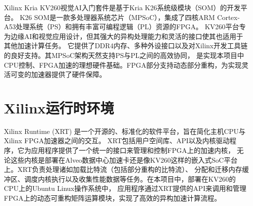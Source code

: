 Xilinx Kria KV260视觉AI入门套件是基于Kria K26系统级模块（SOM）的开发平台。
K26 SOM是一款多处理器系统芯片（MPSoC），集成了四核ARM Cortex-A53处理系统（PS）和拥有丰富可编程逻辑（PL）资源的FPGA。
KV260平台专为边缘AI和视觉应用设计，但其强大的异构处理能力和灵活的接口使其也适用于其他加速计算任务。
它提供了DDR4内存、多种外设接口以及对Xilinx开发工具链的良好支持。其MPSoC架构天然支持PS与PL之间的高效协同，
是实现本项目中CPU控制、FPGA加速的理想硬件基础。FPGA部分支持动态部分重构，为实现灵活可变的加速器提供了硬件保障。

\section{Xilinx运行时环境}

Xilinx Runtime (XRT) 是一个开源的、标准化的软件平台，旨在简化主机CPU与Xilinx FPGA加速器之间的交互。
XRT包括用户空间库、API以及内核驱动程序，它为应用程序提供了一个统一的接口来管理和控制FPGA上的加速内核，
无论这些内核是部署在Alveo数据中心加速卡还是像KV260这样的嵌入式SoC平台上。XRT负责处理诸如加载比特流（包括部分重构的比特流）、
分配和迁移内存缓冲区、调度内核执行以及收集性能数据等任务。在本项目中，部署在KV260的CPU上的Ubuntu Linux操作系统中，
应用程序通过XRT提供的API来调用和管理FPGA上的动态可重构矩阵运算模块，实现了高效的异构加速计算流程。
